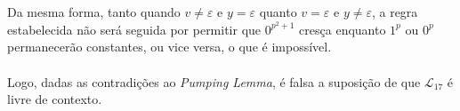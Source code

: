 \documentclass[12pt]{article}
\def\myling{{17}} %
\newcommand{\ve}{\ensuremath{\varepsilon}}
\begin{document}
\begin{tcolorbox}[rounded corners, breakable, colback=yellow!5, colframe=red!40!black, title={A linguagem $\mathcal{L}_{\myling}$ não é livre de contexto.}]
\\
\\
Da mesma forma, tanto quando $v \neq \ve$ e $y = \ve$ quanto $v = \ve$ e $y \neq \ve$, a regra estabelecida não será seguida por permitir que $0^{p^2+1}$ cresça enquanto $1^p$ ou $0^p$ permanecerão constantes, ou vice versa, o que é impossível.
\\
\\
 Logo, dadas as contradições ao \emph{Pumping Lemma}, é falsa a suposição de que $\mathcal{L}_{\myling}$ é livre de contexto.
\end{tcolorbox}
\end{document}
